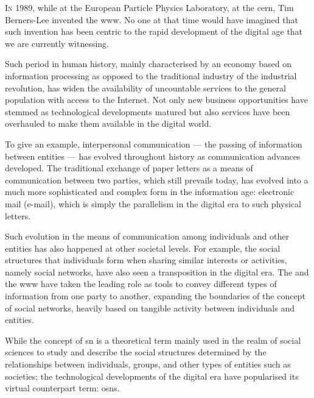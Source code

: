 \documentclass[showtrims,oldfontcommands]{kthesis}
\begin{document}
    
\lettrine{\textcolor[gray]{.25}{I}}{n} 1989, while at the European Particle Physics 
Laboratory, at the \acf{cern}, Tim Berners-Lee invented the \Ac{www}. No one at that 
time would have imagined that such invention has been centric to the rapid development 
of the digital age that we are currently witnessing.

Such period in human history, mainly characterised by an economy based on information 
processing as opposed to the traditional industry of the industrial revolution, 
has widen the availability of uncountable services to the general population with 
access to the Internet. Not only new business opportunities have stemmed as technological 
developments matured but also services have been overhauled to make them available 
in the digital world.

To give an example, interpersonal communication --- the passing of information between 
entities --- has evolved throughout history as communication advances developed. 
The traditional exchange of paper letters as a means of communication between two 
parties, which still prevails today, has evolved into a much more sophisticated 
and complex form in the information age: electronic mail (e-mail), which is simply 
the parallelism in the digital era to such physical letters.

Such evolution in the means of communication among individuals and other entities 
has also happened at other societal levels. For example, the social structures that 
individuals form when sharing similar interests or activities, namely social networks, 
have also seen a transposition in the digital era. The \Internet and the \ac{www} 
have taken the leading role as tools to convey different types of information from 
one party to another, expanding the boundaries of the concept of social networks, 
heavily based on tangible activity between individuals and entities.

While the concept of \acl{sn} is a theoretical term mainly used in the realm of 
social sciences to study and describe the social structures determined by the relationships 
between individuals, groups, and other types of entities such as societies; the 
technological developments of the digital era have popularised its virtual counterpart 
term: \aclp{osn}.
\end{document}
